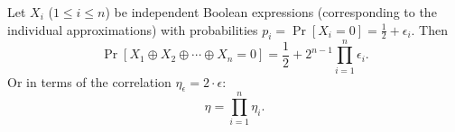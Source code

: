 \begin{tcolorbox}[colback=white,colframe=lemcolor,arc=5pt,title={\color{white}\bf Piling-up Lemma}]
\begin{lemma}
Let $X_i$ ($1\leq i\leq n$) be independent Boolean expressions (corresponding to the individual approximations) with probabilities $p_i=\Pr[X_i=0]=\frac{1}{2}+\epsilon_i$. Then \[
\Pr[X_1\oplus X_2\oplus\cdots\oplus X_n=0]=\frac{1}{2}+2^{n-1}\prod_{i=1}^n\epsilon_i.
\] Or in terms of the correlation $\eta_\epsilon=2\cdot\epsilon$: \[
\eta=\prod_{i=1}^n\eta_i.
\]
\end{lemma}
\end{tcolorbox}



